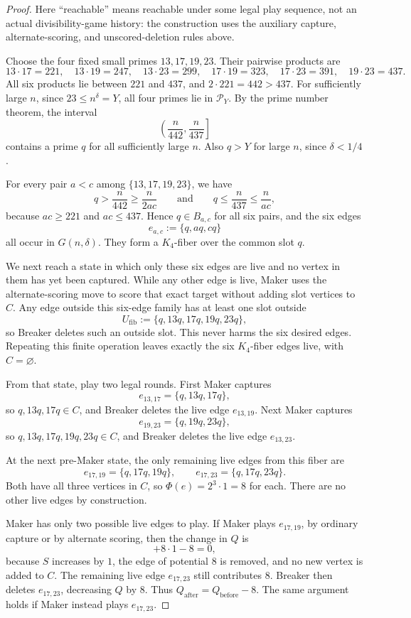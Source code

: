 \begin{proof}
Here ``reachable'' means reachable under some legal play sequence, not
an actual divisibility-game history: the construction uses the auxiliary
capture, alternate-scoring, and unscored-deletion rules above.

Choose the four fixed small primes $13,17,19,23$.  Their pairwise products are
\[
  13\cdot17=221,\quad 13\cdot19=247,\quad 13\cdot23=299,\quad
  17\cdot19=323,\quad 17\cdot23=391,\quad 19\cdot23=437.
\]
All six products lie between $221$ and $437$, and $2\cdot221=442>437$.  For
sufficiently large $n$, since $23\le n^\delta=Y$, all four primes lie in
$\mathcal P_Y$.  By the prime number theorem, the interval
\[
  \left(\frac{n}{442},\frac{n}{437}\right]
\]
contains a prime $q$ for all sufficiently large $n$.  Also $q>Y$ for large
$n$, since $\delta<1/4$.

For every pair $a<c$ among $\{13,17,19,23\}$, we have
\[
  q>\frac n{442}\ge\frac n{2ac}
  \qquad\text{and}\qquad
  q\le\frac n{437}\le\frac n{ac},
\]
because $ac\ge221$ and $ac\le437$.  Hence $q\in B_{a,c}$ for all six pairs,
and the six edges
\[
  e_{a,c}:=\{q,aq,cq\}
\]
all occur in $G(n,\delta)$.  They form a $K_4$-fiber over the common slot $q$.

We next reach a state in which only these six edges are live and no vertex in
them has yet been captured.  While any other edge is live, Maker uses the
alternate-scoring move to score that exact target without adding slot vertices
to $C$.  Any edge outside this six-edge family has at least one slot outside
\[
  U_{\mathrm{fib}}:=\{q,13q,17q,19q,23q\},
\]
so Breaker deletes such an outside slot.  This never harms the six desired
edges.  Repeating this finite operation leaves exactly the six $K_4$-fiber
edges live, with $C=\varnothing$.

From that state, play two legal rounds.  First Maker captures
\[
  e_{13,17}=\{q,13q,17q\},
\]
so $q,13q,17q\in C$, and Breaker deletes the live edge $e_{13,19}$.  Next
Maker captures
\[
  e_{19,23}=\{q,19q,23q\},
\]
so $q,13q,17q,19q,23q\in C$, and Breaker deletes the live edge $e_{13,23}$.

At the next pre-Maker state, the only remaining live edges from this fiber are
\[
  e_{17,19}=\{q,17q,19q\},
  \qquad
  e_{17,23}=\{q,17q,23q\}.
\]
Both have all three vertices in $C$, so $\Phi(e)=2^3\cdot1=8$ for each.  There
are no other live edges by construction.

Maker has only two possible live edges to play.  If Maker plays $e_{17,19}$,
by ordinary capture or by alternate scoring, then the change in $Q$ is
\[
  +8\cdot1-8=0,
\]
because $S$ increases by $1$, the edge of potential $8$ is removed, and no new
vertex is added to $C$.  The remaining live edge $e_{17,23}$ still contributes
$8$.  Breaker then deletes $e_{17,23}$, decreasing $Q$ by $8$.  Thus
$Q_{\mathrm{after}}=Q_{\mathrm{before}}-8$.  The same argument holds if Maker
instead plays $e_{17,23}$.


\end{proof}
